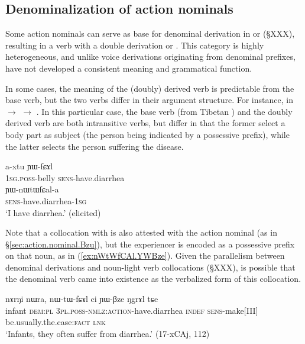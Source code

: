 \subsection{Denominalization of action nominals}  
Some  action nominals can serve as base for denominal derivation in  or  (§XXX), resulting in a verb with a double derivation  or . This category is highly heterogeneous, and unlike voice derivations originating from denominal prefixes, have not developed a consistent meaning and grammatical function.

In some cases, the meaning of the (doubly) derived verb is predictable from the base verb, but the two verbs differ in their argument structure. For instance, in  $\rightarrow$  $\rightarrow$ . In this particular case, the base verb (from Tibetan ) and the doubly derived verb  are both intransitive verbs, but differ in that the former select a body part as subject (the person being indicated by a possessive prefix), while the latter selects the person suffering the disease.

\begin{exe}
\ex \label{ex:axtu.YWfCAl}
\gll a-xtu ɲɯ-fɕɤl \\
\textsc{1sg}.\textsc{poss}-belly \textsc{sens}-have.diarrhea \\
\ex \label{ex:YWnWtWfCala}
\gll ɲɯ-nɯtɯfɕal-a \\
\textsc{sens}-have.diarrhea-\textsc{1sg} \\
\glt `I have diarrhea.' (elicited)
\end{exe}

Note that a collocation with  is also attested with the action nominal  (as in §\ref{sec:action.nominal.Bzu}), but the experiencer is encoded as a possessive prefix on that noun, as  in (\ref{ex:nWtWfCAl.YWBze}). Given the parallelism between denominal derivations and noun-light verb collocations (§XXX), is possible that the denominal verb  came into existence as the verbalized form of this collocation.

\begin{exe}
\ex \label{ex:nWtWfCAl.YWBze}
\gll nɤrŋi nɯra, nɯ-tɯ-fɕɤl ci ɲɯ-βze ŋgrɤl tɕe \\
infant \textsc{dem}:\textsc{pl} \textsc{3pl}.\textsc{poss}-\textsc{nmlz}:\textsc{action}-have.diarrhea \textsc{indef} \textsc{sens}-make[III] be.usually.the.case:\textsc{fact} \textsc{lnk} \\
\glt `Infants, they often suffer from diarrhea.' (17-xCAj, 112)
\end{exe}

